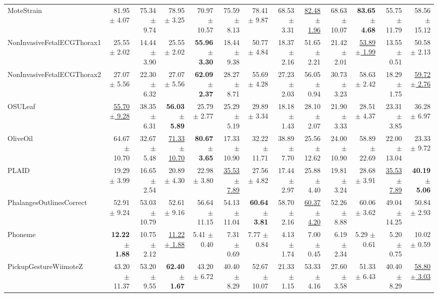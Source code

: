 \begin{landscape}
\begin{longtable}{lrrrrrrrrrrrr}
MoteStrain & 81.95 $\pm$ 4.07 & 75.34 $\pm$ 9.74 & 78.95 $\pm$ 3.25 & 70.97 $\pm$ 10.57 & 75.59 $\pm$ 8.13 & 78.41 $\pm$ 9.87 & 68.53 $\pm$ 3.31 & \underline{82.48 $\pm$ 1.96} & 68.63 $\pm$ 10.07 & \textbf{83.65 $\pm$ 4.68} & 55.75 $\pm$ 11.79 & 58.56 $\pm$ 15.12 \\
NonInvasiveFetalECGThorax1 & 25.55 $\pm$ 2.02 & 14.44 $\pm$ 3.90 & 25.55 $\pm$ 2.02 & \textbf{55.96 $\pm$ 3.30} & 18.44 $\pm$ 9.38 & 50.77 $\pm$ 4.84 & 18.37 $\pm$ 2.16 & 51.65 $\pm$ 2.21 & 21.42 $\pm$ 2.01 & \underline{53.89 $\pm$ 1.99} & 13.55 $\pm$ 0.51 & 50.58 $\pm$ 2.13 \\
NonInvasiveFetalECGThorax2 & 27.07 $\pm$ 5.56 & 22.30 $\pm$ 6.32 & 27.07 $\pm$ 5.56 & \textbf{62.09 $\pm$ 2.37} & 28.27 $\pm$ 8.71 & 55.69 $\pm$ 4.28 & 27.23 $\pm$ 2.03 & 56.05 $\pm$ 0.94 & 30.73 $\pm$ 3.23 & 58.63 $\pm$ 2.42 & 18.29 $\pm$ 1.75 & \underline{59.72 $\pm$ 2.76} \\
OSULeaf & \underline{55.70 $\pm$ 9.28} & 38.35 $\pm$ 6.31 & \textbf{56.03 $\pm$ 5.89} & 25.79 $\pm$ 2.77 & 25.29 $\pm$ 5.19 & 29.89 $\pm$ 3.34 & 18.18 $\pm$ 1.43 & 28.10 $\pm$ 2.07 & 21.90 $\pm$ 3.33 & 28.51 $\pm$ 4.37 & 23.31 $\pm$ 3.85 & 36.28 $\pm$ 6.97 \\
OliveOil & 64.67 $\pm$ 10.70 & 32.67 $\pm$ 5.48 & \underline{71.33 $\pm$ 10.70} & \textbf{80.67 $\pm$ 3.65} & 17.33 $\pm$ 10.90 & 32.22 $\pm$ 11.71 & 38.89 $\pm$ 7.70 & 25.56 $\pm$ 12.62 & 24.00 $\pm$ 10.90 & 58.89 $\pm$ 22.69 & 22.00 $\pm$ 13.04 & 23.33 $\pm$ 9.72 \\
PLAID & 19.29 $\pm$ 3.99 & 16.65 $\pm$ 2.54 & 20.89 $\pm$ 4.30 & 22.98 $\pm$ 3.80 & \underline{35.53 $\pm$ 7.89} & 27.56 $\pm$ 4.82 & 17.44 $\pm$ 2.97 & 25.88 $\pm$ 4.40 & 19.81 $\pm$ 3.24 & 28.68 $\pm$ 3.91 & \underline{35.53 $\pm$ 7.89} & \textbf{40.19 $\pm$ 5.06} \\
PhalangesOutlinesCorrect & 52.91 $\pm$ 9.24 & 53.03 $\pm$ 10.79 & 52.61 $\pm$ 9.16 & 56.64 $\pm$ 11.15 & 54.13 $\pm$ 11.04 & \textbf{60.64 $\pm$ 3.81} & 58.70 $\pm$ 2.16 & \underline{60.37 $\pm$ 4.20} & 52.26 $\pm$ 8.88 & 60.06 $\pm$ 3.62 & 49.04 $\pm$ 14.25 & 50.84 $\pm$ 2.93 \\
Phoneme & \textbf{12.22 $\pm$ 1.88} & 10.75 $\pm$ 2.12 & \underline{11.22 $\pm$ 1.88} & 5.41 $\pm$ 0.40 & 7.31 $\pm$ 0.69 & 7.77 $\pm$ 0.84 & 4.13 $\pm$ 1.74 & 7.00 $\pm$ 0.45 & 6.19 $\pm$ 2.34 & 5.29 $\pm$ 0.61 & 5.20 $\pm$ 0.75 & 10.02 $\pm$ 0.59 \\
PickupGestureWiimoteZ & 43.20 $\pm$ 11.37 & 53.20 $\pm$ 9.55 & \textbf{62.40 $\pm$ 1.67} & 43.20 $\pm$ 6.72 & 40.40 $\pm$ 8.29 & 52.67 $\pm$ 10.07 & 21.33 $\pm$ 1.15 & 53.33 $\pm$ 4.16 & 27.60 $\pm$ 3.58 & 51.33 $\pm$ 6.43 & 40.40 $\pm$ 8.29 & \underline{58.80 $\pm$ 3.03} \\

\end{longtable}
\end{landscape}
